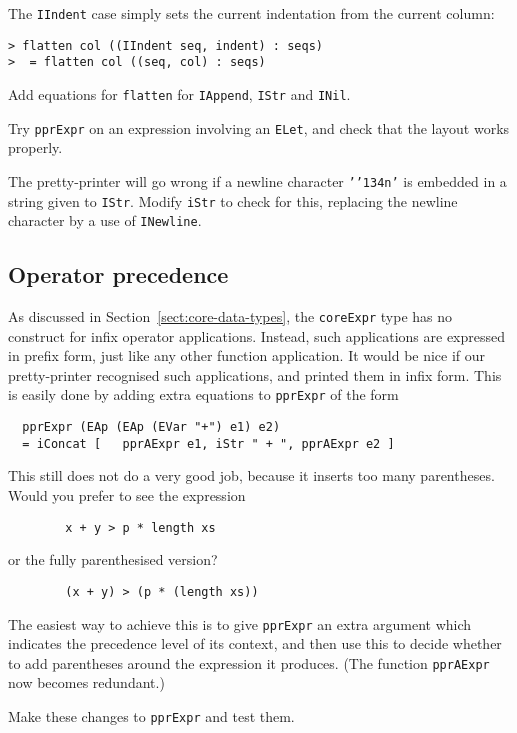 The \mbox{\tt IIndent} case simply sets the current indentation from the
current column:
\begin{verbatim}
> flatten col ((IIndent seq, indent) : seqs)
>  = flatten col ((seq, col) : seqs)
\end{verbatim}
%
\begin{exercise}
Add equations for \mbox{\tt flatten} for \mbox{\tt IAppend}, \mbox{\tt IStr} and \mbox{\tt INil}.

Try \mbox{\tt pprExpr} on an expression involving an \mbox{\tt ELet}, and check that the layout
works properly.
\end{exercise}
\begin{exercise}
The pretty-printer will go wrong if a newline character \mbox{\tt '{\char'134}n'} is
embedded in a string given to \mbox{\tt IStr}. Modify \mbox{\tt iStr} to check for this,
replacing the newline character by a use of \mbox{\tt INewline}.
\end{exercise}

\subsection{Operator precedence}

As discussed in Section~\ref{sect:core-data-types}, the \mbox{\tt coreExpr} type has no
construct for infix operator applications.  Instead, such applications
are expressed in prefix form, just like any other function application.
It would be nice if our pretty-printer recognised such applications, and
printed them in infix form.
This is easily done by adding extra equations to \mbox{\tt pprExpr} of the form
\begin{verbatim}
  pprExpr (EAp (EAp (EVar "+") e1) e2)
  = iConcat [   pprAExpr e1, iStr " + ", pprAExpr e2 ]
\end{verbatim}
This still does not do a very good job, because it inserts too many parentheses.
Would you prefer to see the expression
\begin{verbatim}
        x + y > p * length xs
\end{verbatim}
or the fully parenthesised version?
\begin{verbatim}
        (x + y) > (p * (length xs))
\end{verbatim}
The easiest way to achieve this is to give \mbox{\tt pprExpr} an extra argument
which indicates the precedence level of its context, and then
use this to decide whether to add parentheses around the expression it
produces.
(The function \mbox{\tt pprAExpr} now becomes redundant.)
\begin{exercise}
Make these changes to \mbox{\tt pprExpr} and test them.
\end{exercise}

